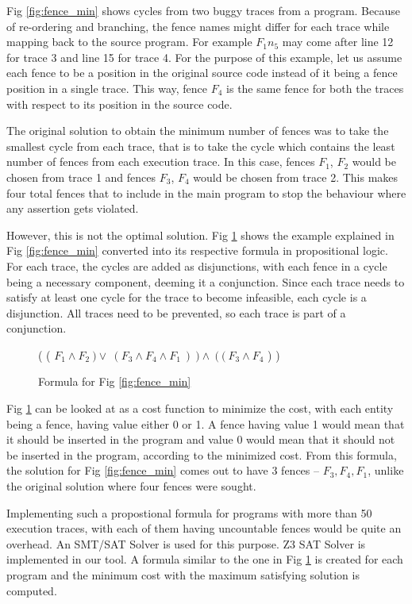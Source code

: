 Fig \ref{fig:fence_min} shows cycles from two buggy traces from a program. Because of re-ordering and branching, the fence names might differ for each trace while mapping back to the source program. For example \textit{$F_1n_5$} may come after line 12 for trace 3 and line 15 for trace 4. For the purpose of this example, let us assume each fence to be a position in the original source code instead of it being a fence position in a single trace. This way, fence \textit{$F_4$} is the same fence for both the traces with respect to its position in the source code.

\par
The original solution to obtain the minimum number of fences was to take the smallest cycle from each trace, that is to take the cycle which contains the least number of fences from each execution trace. In this case, fences \textit{$F_1$}, \textit{$F_2$} would be chosen from trace 1 and fences \textit{$F_3$}, \textit{$F_4$} would be chosen from trace 2. This makes four total fences that to include in the main program to stop the behaviour where any assertion gets violated.

\par
However, this is not the optimal solution. Fig \ref{fig:fence_form} shows the example explained in Fig \ref{fig:fence_min} converted into its respective formula in propositional logic. For each trace, the cycles are added as disjunctions, with each fence in a cycle being a necessary component, deeming it a conjunction. Since each trace needs to satisfy at least one cycle for the trace to become infeasible, each cycle is a disjunction. All traces need to be prevented, so each trace is part of a conjunction.

\begin{figure}
\begin{center}
	( ( $F_1 \land F_2\ ) \lor\ ( F_3 \land F_4 \land F_1\ )\ ) \land\ (\ (\ F_3 \land F_4$ ) )
	\caption{Formula for Fig \ref{fig:fence_min}}
	\label{fig:fence_form}
\end{center}
\end{figure}

\par
Fig \ref{fig:fence_form} can be looked at as a cost function to minimize the cost, with each entity being a fence, having value either 0 or 1. A fence having value 1 would mean that it should be inserted in the program and value 0 would mean that it should not be inserted in the program, according to the minimized cost. From this formula, the solution for Fig \ref{fig:fence_min} comes out to have 3 fences – \textit{$F_3, F_4, F_1$}, unlike the original solution where four fences were sought.

\par
Implementing such a propostional formula for programs with more than 50 execution traces, with each of them having uncountable fences would be quite an overhead. An SMT/SAT Solver is used for this purpose. Z3 SAT Solver is implemented in our tool. A formula similar to the one in Fig \ref{fig:fence_form} is created for each program and the minimum cost with the maximum satisfying solution is computed. 


